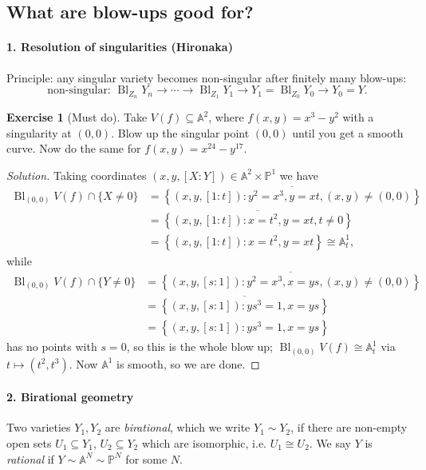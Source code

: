 \documentclass{article}
\theoremstyle{definition}
\newtheorem*{exercise}{Exercise}
\DeclareMathOperator{\Bl}{Bl}
\newcommand{\closure}[1]{\overline{#1}}
\renewcommand{\P}{\mathbb{P}}
\newcommand{\A}{\mathbb{A}}
\begin{document}
\subsection*{What are blow-ups good for?}

\paragraph{1. Resolution of singularities (Hironaka)} Principle: any singular
variety becomes non-singular after finitely many blow-ups:
\begin{equation*}
    \text{non-singular: $\Bl_{Z_n}Y_n$} \to \cdots
        \to \Bl_{Z_1}Y_1 \to Y_1 = \Bl_{Z_0}Y_0 \to Y_0 = Y.
\end{equation*}

\begin{exercise}[Must do]
    Take $V(f)\subseteq\A^2$, where $f(x,y)=x^3-y^2$ with a singularity at
    $(0,0)$. Blow up the singular point $(0,0)$ until you get a smooth curve.
    Now do the same for $f(x,y)=x^{24}-y^{17}$.
\end{exercise}

\begin{proof}[Solution]
    Taking coordinates $(x,y,[X:Y])\in\A^2\times\P^1$ we have
    \begin{align*}
        \Bl_{(0,0)}V(f) \cap \{X\ne0\}
            &= \closure{\left\{(x,y,[1:t]):y^2=x^3,y=xt,(x,y)\ne(0,0)\right\}} \\
            &= \closure{\left\{(x,y,[1:t]):x=t^2,y=xt,t\ne0\right\}} \\
            &= \left\{(x,y,[1:t]):x=t^2,y=xt\right\} \cong \A^1_t,
    \end{align*}
    while
    \begin{align*}
        \Bl_{(0,0)}V(f) \cap \{Y\ne0\}
            &= \closure{\left\{(x,y,[s:1]):y^2=x^3,x=ys,(x,y)\ne(0,0)\right\}} \\
            &= \closure{\left\{(x,y,[s:1]):ys^3=1,x=ys\right\}} \\
            &= \left\{(x,y,[s:1]):ys^3=1,x=ys\right\}
    \end{align*}
    has no points with $s=0$, so this is the whole blow up;
    $\Bl_{(0,0)}V(f)\cong\A^1_t$ via $t\mapsto(t^2,t^3)$. Now $\A^1$ is smooth,
    so we are done. %
\end{proof}

\paragraph{2. Birational geometry} Two varieties $Y_1,Y_2$ are
\emph{birational}, which we write $Y_1\sim Y_2$, if there are
non-empty open sets $U_1\subseteq Y_1$, $U_2\subseteq Y_2$ which are isomorphic,
i.e. $U_1\cong U_2$. We say $Y$ is \emph{rational} if
$Y\sim\A^N\sim\P^N$ for some $N$.
\end{document}
